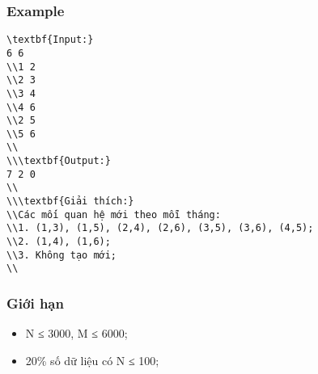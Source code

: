 \subsubsection{   Example  }
\begin{verbatim}
\textbf{Input:}
6 6
\\1 2
\\2 3
\\3 4
\\4 6
\\2 5
\\5 6
\\
\\\textbf{Output:}
7 2 0
\\
\\\textbf{Giải thích:}
\\Các mối quan hệ mới theo mỗi tháng:
\\1. (1,3), (1,5), (2,4), (2,6), (3,5), (3,6), (4,5);
\\2. (1,4), (1,6);
\\3. Không tạo mới;
\\\end{verbatim}

\subsubsection{   Giới hạn  }
\begin{itemize}
	\item     N ≤ 3000, M ≤ 6000;   
	\item     20\% số dữ liệu có N ≤ 100;   
\end{itemize}
